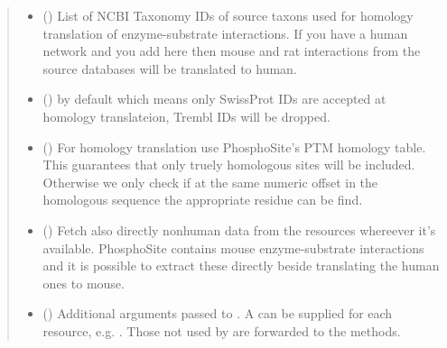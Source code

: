 \documentclass[letterpaper,10pt,english]{sphinxmanual}
\begin{document}
\begin{fulllineitems}
\begin{fulllineitems}
\begin{quote}
\begin{description}
\begin{itemize}
\item {} 
 () \textendash{} List of NCBI Taxonomy IDs of
source taxons used for homology translation of enzyme-substrate
interactions. If you have a human network and you add here
\sphinxtitleref{{[}10090, 10116{]}} then mouse and rat interactions from the source
databases will be translated to human.

\item {} 
 () \textendash{}  by default which means
only SwissProt IDs are accepted at homology translateion, Trembl
IDs will be dropped.

\item {} 
 () \textendash{} For homology translation use
PhosphoSite’s PTM homology table. This guarantees that only
truely homologous sites will be included. Otherwise we only
check if at the same numeric offset in the homologous sequence
the appropriate residue can be find.

\item {} 
 () \textendash{} Fetch also directly nonhuman
data from the resources whereever it’s available. PhosphoSite
contains mouse enzyme-substrate interactions and it is possible
to extract these directly beside translating the human ones
to mouse.

\item {} 
 () \textendash{} Additional arguments passed to .
A  can be supplied for each resource, e.g.
.
Those not used by  are forwarded to the
 methods.

\end{itemize}

\end{description}\end{quote}

\end{fulllineitems}


\end{fulllineitems}
\end{document}
